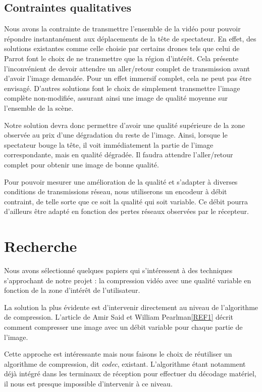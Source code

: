 \documentclass[11pt,a4paper]{article}
\begin{document}
\subsection{Contraintes qualitatives}

Nous avons la contrainte de transmettre l’ensemble de la vidéo pour pouvoir répondre instantanément aux déplacements de la tête de spectateur.
En effet, des solutions existantes comme celle choisie par certains drones tels que celui de Parrot font le choix de ne transmettre que la région d’intérêt. Cela présente l’inconvénient de devoir attendre un aller/retour complet de transmission avant d’avoir l’image demandée. Pour un effet immersif complet, cela ne peut pas être envisagé.
D’autres solutions font le choix de simplement transmettre l’image complète non-modifiée, assurant ainsi une image de qualité moyenne sur l’ensemble de la scène.

\bigbreak
Notre solution devra donc permettre d’avoir une qualité supérieure de la zone observée au prix d’une dégradation du reste de l’image.
Ainsi, lorsque le spectateur bouge la tête, il voit immédiatement la partie de l’image correspondante, mais en qualité dégradée. Il faudra attendre l’aller/retour complet pour obtenir une image de bonne qualité.

\bigbreak
Pour pouvoir mesurer une amélioration de la qualité et s’adapter à diverses conditions de transmissions réseau, nous utiliserons un encodeur à débit contraint, de telle sorte que ce soit la qualité qui soit variable.
Ce débit pourra d’ailleurs être adapté en fonction des pertes réseaux observées par le récepteur.


\section{Recherche}

Nous avons sélectionné quelques papiers qui s'intéressent à des techniques s'approchant de notre projet : la compression vidéo avec une qualité variable en fonction de la zone d'intérêt de l'utilisateur.

\bigbreak
La solution la plus évidente est d'intervenir directement au niveau de l'algorithme de compression.
L'article de Amir Said et William Pearlman\ref{REF1} décrit comment compresser une image avec un débit variable pour chaque partie de l'image.

Cette approche est intéressante mais nous faisons le choix de réutiliser un algorithme de compression, dit \textit{codec}, existant.
L'algorithme étant notamment déjà intégré dans les terminaux de réception pour effectuer du décodage matériel, il nous est presque impossible d'intervenir à ce niveau.
\end{document}
